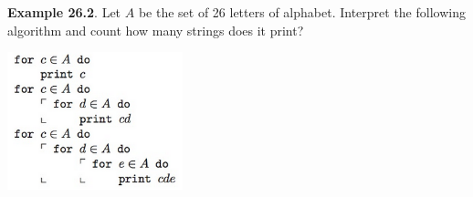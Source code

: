 \documentclass[aspectratio=169]{beamer}
\begin{document}
\begin{frame}[plain]{}


 {\bf Example 26.2}. Let $A$ be the set of 26 letters of alphabet. 
		  Interpret the following algorithm and count 
		  how many strings does it print?
		  
	\begin{center}
			\includegraphics[height=4cm]{./img/lecture26-fig2.png} 
	\end{center}
 \medskip

\vspace{.5in}

 		
 


\end{frame}
\end{document}
